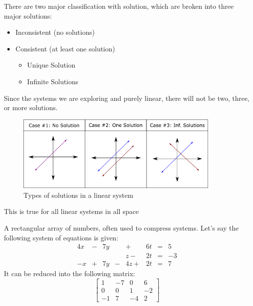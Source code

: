 \documentclass{report}
\begin{document}
\begin{definition}
There are two major classification with solution, which are broken into three major solutions:
\begin{itemize}
	\item Inconsistent (no solutions)
	\item Consistent (at least one solution)
	\begin{itemize}
		\item Unique Solution
		\item Infinite Solutions
	\end{itemize}
\end{itemize}
Since the systems we are exploring and purely linear, there will not be two, three, or more solutions.
\end{definition}
\begin{figure}[h]

\begin{center}
  \includegraphics[width=10cm]{figures/solutions}
  \caption{Types of solutions in a linear system}
  \label{fig:graph1}
\end{center}
\end{figure}

\begin{remark}
This is true for all linear systems in all space
\end{remark}

\begin{definition}[Matrix]
A rectangular array of numbers, often used to compress systems. Let's say the following system of equations is given:
\begin{alignat*}{4}
 x & {}-{} & 7y & {} {} &    {}+{} & 6t & {}={} &  5 \\
   & {} {} &    & {} {} &  z {}-{} & 2t & {}={} & -3 \\
-x & {}+{} & 7y & {}-{} & 4z {}+{} & 2t & {}={} &  7
\end{alignat*}
It can be reduced into the following matrix:
\begin{equation*}
\begin{bmatrix}
1 & -7 & 0 & 6 \\ 
0 & 0 & 1 & -2 \\ 
-1 & 7 & -4 & 2
\end{bmatrix}
\end{equation*}
\end{definition}
\end{document}
